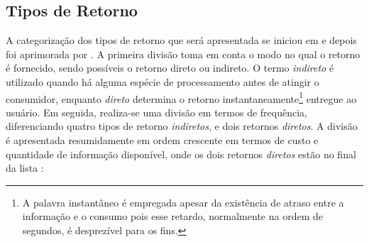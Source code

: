 \subsection{Tipos de Retorno}
\label{ssec:ret_tipos}

A categorização dos tipos de retorno que será apresentada se iniciou em
\cite{2000_darby} e depois foi aprimorada por \cite{2009_epri}. A primeira divisão
toma em conta o modo no qual o retorno é fornecido, sendo possíveis o retorno 
direto ou indireto. O termo \emph{indireto} é
utilizado quando há alguma espécie de processamento antes de atingir o
consumidor, enquanto \emph{direto} determina o retorno
instantaneamente\footnote{A palavra instantâneo é empregada apesar da
existência de atraso entre a informação e o consumo pois esse
retardo, normalmente na ordem de segundos, é desprezível para os fins.} entregue
ao usuário. Em seguida, realiza-se uma divisão em termos de frequência,
diferenciando quatro tipos de retorno \emph{indiretos}, e dois retornos
\emph{diretos}. A divisão é apresentada resumidamente em ordem crescente em 
termos de custo e 
quantidade de informação disponível, onde os dois retornos \emph{diretos} estão no
final da lista \cite{aceee_2010_estudos_feedback,2009_epri}:

